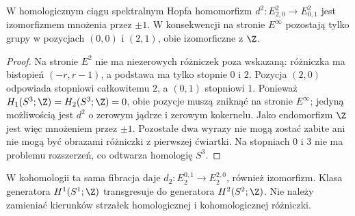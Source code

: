 \begin{center}
\end{center}

\begin{twierdzenie}
W homologicznym ciągu spektralnym Hopfa homomorfizm
$d^2:E^2_{2,0}\to E^2_{0,1}$ jest izomorfizmem
mnożenia przez $\pm1$. W konsekwencji na stronie
$E^\infty$ pozostają tylko grupy w pozycjach $(0,0)$
i $(2,1)$, obie izomorficzne z $\Z$.
\end{twierdzenie}
\begin{proof}
Na stronie $E^2$ nie ma niezerowych różniczek poza
wskazaną: różniczka ma bistopień $(-r,r-1)$,
a podstawa ma tylko stopnie $0$ i $2$.
Pozycja $(2,0)$ odpowiada stopniowi całkowitemu $2$,
a $(0,1)$ stopniowi $1$. Ponieważ
$H_1(S^3;\Z)=H_2(S^3;\Z)=0$, obie pozycje muszą
zniknąć na stronie $E^\infty$; jedyną możliwością
jest $d^2$ o zerowym jądrze i zerowym kokernelu.
Jako endomorfizm $\Z$ jest więc mnożeniem przez $\pm1$.
Pozostałe dwa wyrazy nie mogą zostać zabite ani nie mogą
być obrazami różniczki z pierwszej ćwiartki.
Na stopniach $0$ i $3$ nie ma problemu rozszerzeń,
co odtwarza homologię $S^3$.
\end{proof}
\begin{uwaga}
W kohomologii ta sama fibracja daje
$d_2:E_2^{0,1}\to E_2^{2,0}$, również izomorfizm.
Klasa generatora $H^1(S^1;\Z)$ transgresuje do generatora
$H^2(S^2;\Z)$. Nie należy zamieniać kierunków strzałek
homologicznej i kohomologicznej różniczki.
\end{uwaga}

